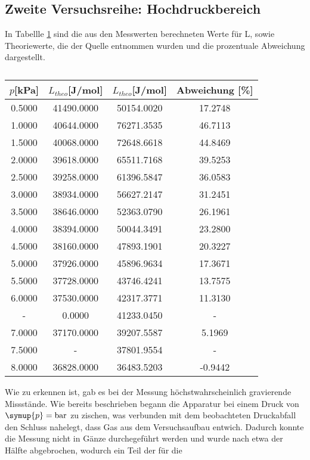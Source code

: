 \subsection{Zweite Versuchsreihe: Hochdruckbereich}
In Tabellle \ref{tab:hdr} sind die aus den Messwerten berechneten Werte für L, sowie Theoriewerte, die der
Quelle \cite{Dampfdrucktabelle} entnommen wurden und die prozentuale Abweichung dargestellt.
\begin{table}[H]
\centering
   \caption{}
   \label{tab:hdr}
   \begin{tabular}{c c c c}
   \toprule
     $p$[kPa] & $L_{theo}$[J/mol] & $L_{theo}$[J/mol] & Abweichung [\%] \\
    \midrule
      0.5000 & 41490.0000 & 50154.0020 &    17.2748 \\     1.0000 & 40644.0000 & 76271.3535 &    46.7113 \\     1.5000 & 40068.0000 & 72648.6618 &    44.8469 \\     2.0000 & 39618.0000 & 65511.7168 &    39.5253 \\     2.5000 & 39258.0000 & 61396.5847 &    36.0583 \\     3.0000 & 38934.0000 & 56627.2147 &    31.2451 \\     3.5000 & 38646.0000 & 52363.0790 &    26.1961 \\     4.0000 & 38394.0000 & 50044.3491 &    23.2800 \\     4.5000 & 38160.0000 & 47893.1901 &    20.3227 \\     5.0000 & 37926.0000 & 45896.9634 &    17.3671 \\     5.5000 & 37728.0000 & 43746.4241 &    13.7575 \\     6.0000 & 37530.0000 & 42317.3771 &    11.3130 \\     - &     0.0000 & 41233.0450 &   - \\     7.0000 & 37170.0000 & 39207.5587 &     5.1969 \\     7.5000 &     - & 37801.9554 &   - \\     8.0000 & 36828.0000 & 36483.5203 &    -0.9442 \\ 
    \bottomrule
    \end{tabular}
\end{table}
Wie zu erkennen ist, gab es bei der Messung höchstwahrscheinlich gravierende Missstände.
Wie bereits beschrieben begann die Apparatur bei einem Druck von $\symup{p} = \si{\bar}$ zu zischen, was verbunden mit dem beobachteten Druckabfall den Schluss nahelegt, dass
Gas aus dem Versuchsaufbau entwich. Dadurch konnte die Messung nicht in Gänze durchegeführt werden und wurde nach etwa der Hälfte abgebrochen, wodurch ein Teil der für die 
